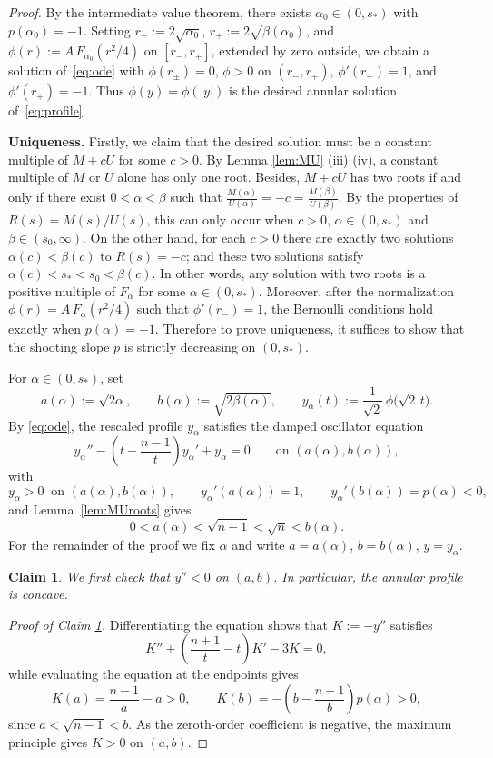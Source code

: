 \documentclass[11pt]{article}
\numberwithin{equation}{section}
\newtheorem{claim}[theorem]{Claim}
\theoremstyle{definition}
\begin{document}
\begin{proof}
By the intermediate value theorem, there exists $\alpha_0 \in (0,s_*)$ with $p(\alpha_0) = -1$. Setting $r_- := 2\sqrt{\alpha_0}$, $r_+ := 2\sqrt{\beta(\alpha_0)}$, and $\phi(r) := A\,F_{\alpha_0}(r^2/4)$ on $[r_-,r_+]$, extended by zero outside, we obtain a solution of~\eqref{eq:ode} with $\phi(r_\pm)=0$, $\phi > 0$ on $(r_-,r_+)$, $\phi'(r_-)=1$, and $\phi'(r_+)=-1$. Thus $\phi(y) = \phi(|y|)$ is the desired annular solution of~\eqref{eq:profile}.
\bigskip

{\bf Uniqueness.} Firstly, we claim that the desired solution must be a constant multiple of $M+cU$ for some $c>0$. By Lemma \ref{lem:MU} (iii) (iv), a constant multiple of $M$ or $U$ alone has only one root. Besides, $M+cU$ has two roots if and only if there exist $0<\alpha<\beta$ such that $\frac{M(\alpha)}{U(\alpha)} =-c = \frac{M(\beta)}{U(\beta)}$.
By the properties of $R(s)=M(s)/U(s)$, this can only occur when $c>0$, $\alpha\in (0,s_*)$ and $\beta \in (s_0, \infty)$.
On the other hand, for each $c>0$ there are exactly two solutions $\alpha(c)<\beta(c)$ to $R(s) = -c$; and these two solutions satisfy $\alpha(c)< s_* < s_0 < \beta(c)$.
In other words, any solution with two roots is a positive multiple of $F_\alpha$ for some $\alpha\in(0,s_*)$. 
Moreover, after the normalization $\phi(r)=A\,F_\alpha(r^2/4)$ such that $\phi'(r_-)=1$, the Bernoulli conditions hold exactly when $p(\alpha)=-1$. Therefore to prove uniqueness, it suffices to show that the shooting slope $p$ is strictly decreasing on $(0,s_*)$.

For $\alpha\in(0,s_*)$, set
\begin{equation}\label{tmp:annular-scaled-notation}
    a(\alpha):=\sqrt{2\alpha},
 \qquad
 b(\alpha):=\sqrt{2\beta(\alpha)},
 \qquad
 y_\alpha(t):=\frac1{\sqrt2}\,\phi\bigl(\sqrt2\,t\bigr).
\end{equation}
By \eqref{eq:ode}, the rescaled profile $y_\alpha$ satisfies the damped oscillator equation
\begin{equation}\label{eq:y-alpha}
    y_\alpha''-\left(t-\frac{n-1}{t}\right)y_\alpha'+y_\alpha=0
 \qquad\text{on }(a(\alpha),b(\alpha)),
\end{equation}
with
\[
 y_\alpha>0\ \text{ on }(a(\alpha),b(\alpha)),
 \qquad
 y_\alpha'(a(\alpha))=1,
 \qquad
 y_\alpha'(b(\alpha))=p(\alpha)<0,
\]
and Lemma~\ref{lem:MUroots} gives
\[
 0<a(\alpha)<\sqrt{n-1}<\sqrt n<b(\alpha).
\]
For the remainder of the proof we fix $\alpha$ and write $a=a(\alpha)$, $b=b(\alpha)$, $y=y_\alpha$.

\begin{claim}\label{cl:concave}
    We first check that $y''<0$ on $(a,b)$. In particular, the annular profile is concave.
\end{claim}
\noindent \emph{Proof of Claim \ref{cl:concave}.}
Differentiating the equation shows that $K:=-y''$ satisfies
\begin{equation}\label{eq:y-2ndder}
    K''+\left(\frac{n+1}{t}-t\right)K'-3K=0,
\end{equation}
while evaluating the equation at the endpoints gives
\[
 K(a)=\frac{n-1}{a}-a>0,
 \qquad
 K(b)=-\left(b-\frac{n-1}{b}\right)p(\alpha)>0,
\]
since $a<\sqrt{n-1}<b$. As the zeroth-order coefficient is negative, the maximum principle gives $K>0$ on $(a,b)$.


\end{proof}
\end{document}
